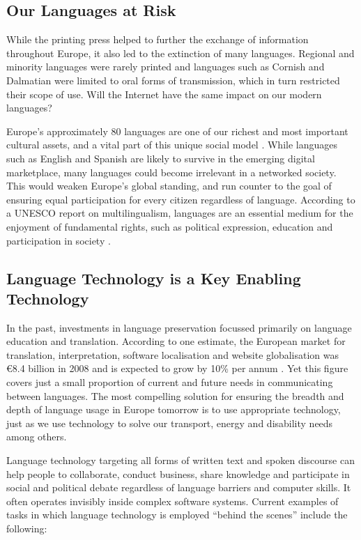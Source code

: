 \documentclass[]{../../metanetpaper}
\begin{document}
\begin{multicols}{2}
\subsection{Our Languages at Risk}

While the printing press helped to further the exchange of information throughout Europe, it also led to the extinction of many languages. Regional and minority languages were rarely printed and languages such as Cornish and Dalmatian were limited to oral forms of transmission, which in turn restricted their scope of use. Will the Internet have the same impact on our modern languages?


Europe’s approximately 80 languages are one of our richest and most important cultural assets, and a vital part of this unique social model \cite{EC2}. While languages such as English and Spanish are likely to survive in the emerging digital marketplace, many languages could become irrelevant in a networked society. This would weaken Europe’s global standing, and run counter to the goal of ensuring equal participation for every citizen regardless of language. According to a UNESCO report on multilingualism, languages are an essential medium for the enjoyment of fundamental rights, such as political expression, education and participation in society \cite{Unesco1}.

\subsection{Language Technology is a Key Enabling Technology}

In the past, investments in language preservation focussed primarily on language education and translation. According to one estimate, the European market for translation, interpretation, software localisation and website globalisation was €8.4 billion in 2008 and is expected to grow by 10\% per annum \cite{EC3}. Yet this figure covers just a small proportion of current and future needs in communicating between languages. The most compelling solution for ensuring the breadth and depth of language usage in Europe tomorrow is to use appropriate technology, just as we use technology to solve our transport, energy and disability needs among others.

Language technology targeting all forms of written text and spoken discourse can help people to collaborate, conduct business, share knowledge and participate in social and political debate regardless of language barriers and computer skills. It often operates invisibly inside complex software systems. Current examples of tasks in which language technology is employed ``behind the scenes'' include the following: 


\end{multicols}
\end{document}
